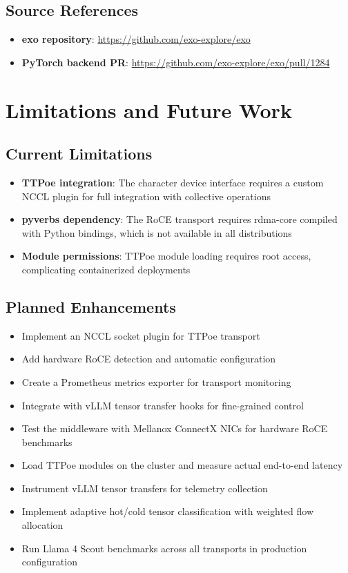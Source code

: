 \documentclass[10pt,letterpaper]{article}
\begin{document}
\subsection{Source References}

\begin{itemize}[noitemsep]
    \item \textbf{exo repository}: \url{https://github.com/exo-explore/exo}
    \item \textbf{PyTorch backend PR}: \url{https://github.com/exo-explore/exo/pull/1284}
\end{itemize}

\section{Limitations and Future Work}

\subsection{Current Limitations}

\begin{itemize}[noitemsep]
    \item \textbf{TTPoe integration}: The character device interface requires a custom NCCL plugin for full integration with collective operations
    \item \textbf{pyverbs dependency}: The RoCE transport requires rdma-core compiled with Python bindings, which is not available in all distributions
    \item \textbf{Module permissions}: TTPoe module loading requires root access, complicating containerized deployments
\end{itemize}

\subsection{Planned Enhancements}

\begin{itemize}[noitemsep]
    \item Implement an NCCL socket plugin for TTPoe transport
    \item Add hardware RoCE detection and automatic configuration
    \item Create a Prometheus metrics exporter for transport monitoring
    \item Integrate with vLLM tensor transfer hooks for fine-grained control
    \item Test the middleware with Mellanox ConnectX NICs for hardware RoCE benchmarks
    \item Load TTPoe modules on the cluster and measure actual end-to-end latency
    \item Instrument vLLM tensor transfers for telemetry collection
    \item Implement adaptive hot/cold tensor classification with weighted flow allocation
    \item Run Llama 4 Scout benchmarks across all transports in production configuration
\end{itemize}
\end{document}
